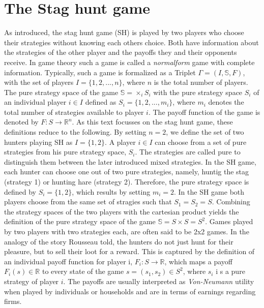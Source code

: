 \documentclass[11pt]{article}
\newcommand{\realnumb}{\mathbb{R}}
\begin{document}
\section{The Stag hunt game}
\label{sec:traditional}
As introduced, the stag hunt game (SH) is played by two players who choose their
strategies without knowing each others choice.
Both have information about the strategies of the
other player and the payoffs they and their opponents receive. In game theory
such a game is called a \textit{normalform} game with complete information. 
Typically, such a game is formalized as a Triplet $\Gamma = (I,\mathbb{S},F)$, 
with the set of players $I=\{1,2,...,n\}$, where $n$ is the 
total number of players. The pure strategy space of the game 
$\mathbb{S} = \times_i S_i$ with the pure strategy space $S_i$ of an 
individual player  $i \in I$ defined as $S_i = \{1,2,...,m_i\}$, where $m_i$ 
denotes the total number of strategies available to player $i$. The payoff 
function of the game is denoted by $F: S \rightarrow \realnumb^n$.
As this text focusses on the stag hunt game, these definitions reduce to the 
following.
By setting $n=2$, we define the set of two hunters playing SH as $I=\{1,2\}$. A 
player $i \in I$  can choose from a set of pure strategies from his 
pure strategy space, $S_i$. The strategies are called pure to distinguish
them between the later introduced mixed strategies. 
In the SH game, each hunter can choose one out of two pure strategies, namely, 
huntig the stag (strategy 1) or hunting hare (strategy 2).
Therefore, the pure strategy space is defined by $S_i = \{1,2\}$, which results
by setting $m_i=2$. In the SH game both players choose from
the same set of stragies such that $S_1 =S_2=S$. Combining the strategy spaces
of the two players with the cartesian product
yields the definition of the pure strategy space of the game
$\mathbb{S}= S \times S = S^2$. Games played by two players with two strategies
each, are often said to be 2x2 games.    
In the analogy of the story Rousseau told, the hunters do not just hunt
for their pleasure, but to sell their loot for a reward. 
This is captured by the definition of an individual payoff function for player
i, $F_i:S \rightarrow \realnumb$, which maps a payoff $F_i(s) \in \realnumb$ 
to every state of the game $s=(s_1,s_2) \in S^2$, where $s_i$ i s a pure
strategy of player $i$.
The payoffs are usually interpreted as \textit{Von-Neumann} utility when 
played by individuals or households and are in terms of earnings regarding 
firms. 
\end{document}
